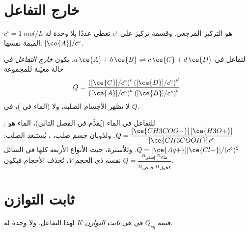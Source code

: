 \section{خارج التفاعل}

\begin{notation}\label{not:g12:equilibrium:c-standard}
$c^\circ = \qty{1}{mol/L}$ هو التركيز المرجعي. وقسمة
تركيز على $c^\circ$ تعطي عددًا بلا وحدة له
القيمة نفسها: $[\ce{A}]/c^\circ$.
\end{notation}

\begin{definition}\label{def:g12:equilibrium:quotient}
لتفاعل في  $a\,\ce{A} + b\,\ce{B} \rightleftharpoons c\,\ce{C} + d\,\ce{D}$، يكون \emph{خارج
التفاعل} في حالة معيّنة للمجموعة
\[
  Q = \frac{\left([\ce{C}]/c^\circ\right)^c \left([\ce{D}]/c^\circ\right)^d}
           {\left([\ce{A}]/c^\circ\right)^a \left([\ce{B}]/c^\circ\right)^b} .
\]
لا تظهر الأجسام الصلبة، ولا  (الماء في )، في
$Q$.
\end{definition}


\begin{example}\label{ex:g12:equilibrium:quotients}
للتفاعل  في الماء (يُقدَّم  
في الفصل التالي)، الماء هو :
$Q = \dfrac{[\ce{CH3COO-}]\,[\ce{H3O+}]}{[\ce{CH3COOH}]\,c^\circ}$. ولذوبان
جسم صلب، ، يُستبعد الصلب:
$Q = [\ce{Ag+}][\ce{Cl-}]/(c^\circ)^2$. وللأسترة، حيث الأنواع الأربعة
كلها في  السائل نفسه ذي الحجم $V$، تُحذف الأحجام
فيكون $Q = \dfrac{n_{\text{إستر}}\, n_{\text{ماء}}}{n_{\text{حمض}}\, n_{\text{كحول}}}$.
\end{example}

\section{ثابت التوازن}

\begin{definition}\label{def:g12:equilibrium:constant}
قيمة $Q_{eq}$  في  هي
\emph{ثابت التوازن} $K$ لهذا
التفاعل. ولا وحدة له.
\end{definition}

